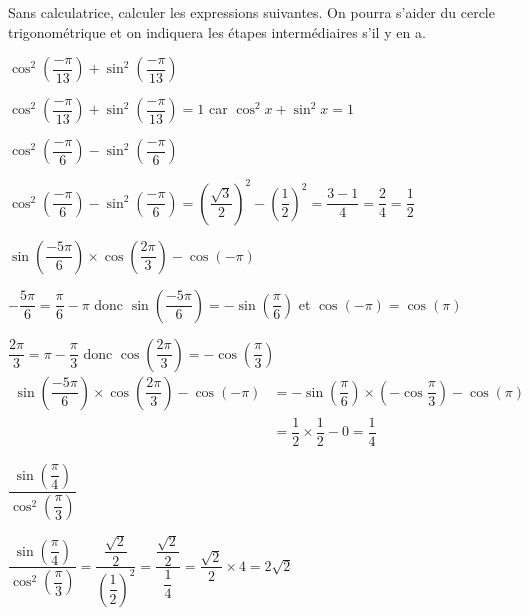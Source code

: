\documentclass[11pt,a4paper]{article}  %
\begin{document}
Sans calculatrice, calculer les expressions suivantes. On pourra s'aider du cercle trigonométrique et on indiquera les étapes intermédiaires s'il y en a.
\begin{enumMet}
	\item $\cos ^2\left(\dfrac{-\pi}{13}\right)+\sin ^2\left(\dfrac{-\pi}{13}\right)$
	\begin{corrBox}
		$\cos ^2\left(\dfrac{-\pi}{13}\right)+\sin ^2\left(\dfrac{-\pi}{13}\right)=1$ car $\cos ^2 x+\sin ^2 x=1$	
	\end{corrBox}
	\item $\cos ^2\left(\dfrac{-\pi}{6}\right)-\sin ^2\left(\dfrac{-\pi}{6}\right)$
	\begin{corrBox}
		$\cos ^2\left(\dfrac{-\pi}{6}\right)-\sin ^2\left(\dfrac{-\pi}{6}\right)=\left(\dfrac{\sqrt{3}}{2}\right)^2-\left(\dfrac{1}{2}\right)^2=\dfrac{3-1}{4}=\dfrac{2}{4}=\dfrac{1}{2}$
	\end{corrBox}
	\item $\sin \left(\dfrac{-5 \pi}{6}\right) \times \cos \left(\dfrac{2 \pi}{3}\right)-\cos (-\pi)$
	\begin{corrBox}
		$-\dfrac{5 \pi}{6}=\dfrac{\pi}{6}-\pi$ donc $\sin \left(\dfrac{-5 \pi}{6}\right)=-\sin \left(\dfrac{\pi}{6}\right)$
		et $\cos (-\pi)=\cos (\pi)$
		
		$\dfrac{2 \pi}{3}=\pi-\dfrac{\pi}{3}$ donc $\cos \left(\dfrac{2 \pi}{3}\right)=-\cos \left(\dfrac{\pi}{3}\right)$
		$$
		\begin{aligned}
			\sin \left(\dfrac{-5 \pi}{6}\right) \times \cos \left(\dfrac{2 \pi}{3}\right)-\cos (-\pi) & =-\sin \left(\dfrac{\pi}{6}\right) \times\left(-\cos \dfrac{\pi}{3}\right)-\cos (\pi) \\
			& =\dfrac{1}{2} \times \dfrac{1}{2}-0=\dfrac{1}{4}
		\end{aligned}
		$$					
	\end{corrBox}
	\item $\dfrac{\sin \left(\dfrac{\pi}{4}\right)}{\cos ^2\left(\dfrac{\pi}{3}\right)}$
	\begin{corrBox}
		$\dfrac{\sin \left(\dfrac{\pi}{4}\right)}{\cos ^2\left(\dfrac{\pi}{3}\right)}=\dfrac{\dfrac{\sqrt{2}}{2}}{\left(\dfrac{1}{2}\right)^2}=\dfrac{\dfrac{\sqrt{2}}{2}}{\dfrac{1}{4}}=\dfrac{\sqrt{2}}{2}\times 4=2\sqrt{2}$
	\end{corrBox}
\end{enumMet}
\end{document}
